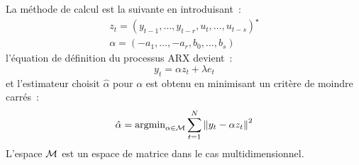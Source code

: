 La m\'ethode de calcul est la suivante en introduisant~:
\begin{equation}
	\begin{array}{l}
	z_{t}= (y_{t-1},\ldots,y_{t-r},u_{t},\ldots,u_{t-s})^\star \\[3mm]
	\alpha = (-a_{1},\ldots,-a_{r},b_{0},...,b_{s})
	\end{array}
\end{equation}
l'\'equation de d\'efinition du processus ARX devient~:
\begin{equation}
	y_{t}= \alpha z_{t} + \lambda e_{t}
\end{equation}
et l'estimateur choisit $\hat{\alpha}$ pour $\alpha$ est obtenu en minimisant 
 un crit\`ere de moindre carr\'es~:
\begin{equation}
	\hat{\alpha} = \mbox{argmin}_{\alpha \in {\cal M}}
	\sum_{t=1}^N {\Vert y_{t} -\alpha z_{t}  \Vert}^2
\end{equation}
L'espace ${\cal M}$ est un espace de matrice dans le cas multidimensionnel. 




